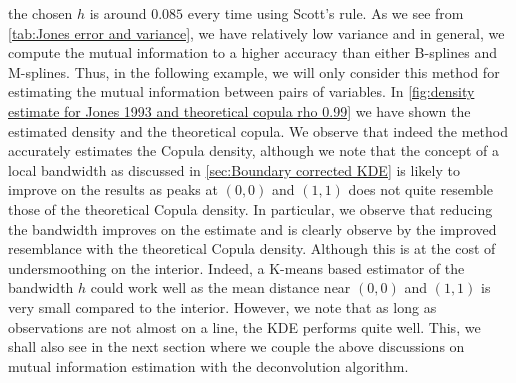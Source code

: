 \documentclass[../Thesis.tex]{subfiles}
\begin{document}
the chosen $h$ is around $0.085$ every time using Scott's rule. As we see from \autoref{tab:Jones error and variance}, we have relatively low variance and in general, we compute the mutual information to a higher accuracy than either B-splines and M-splines. Thus, in the following example, we will only consider this method for estimating the mutual information between pairs of variables. In \autoref{fig:density estimate for Jones 1993 and theoretical copula rho 0.99} we have shown the estimated density and the theoretical copula. We observe that indeed the method accurately estimates the Copula density, although we note that the concept of a local bandwidth as discussed in \autoref{sec:Boundary corrected KDE} is likely to improve on the results as peaks at $(0,0)$ and $(1,1)$ does not quite resemble those of the theoretical Copula density. In particular, we observe that reducing the bandwidth improves on the estimate and is clearly observe by the improved resemblance with the theoretical Copula density. Although this is at the cost of undersmoothing on the interior. Indeed, a K-means based estimator of the bandwidth $h$ could work well as the mean distance near $(0,0)$ and $(1,1)$ is very small compared to the interior. However, we note that as long as observations are not almost on a line, the KDE performs quite well. This, we shall also see in the next section where we couple the above discussions on mutual information estimation with the deconvolution algorithm.
\end{document}
